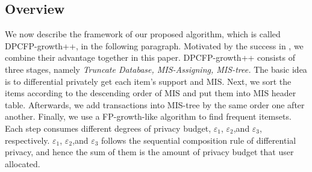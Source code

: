 \documentclass[conference]{IEEEtran}
\begin{document}
\subsection{Overview}
We now describe the framework of our proposed algorithm, which is called DPCFP-growth++, in the following paragraph. 
Motivated by the success in \cite{b4}\cite{b6}\cite{b8}, we combine their advantage together in this paper. 
DPCFP-growth++ consists of three stages, namely {\it{Truncate Database}, \it{MIS-Assigning}, \it{MIS-tree}.} 
The basic idea is to differential privately get each item's support and MIS. 
Next, we sort the items according to the descending order of MIS and put them into MIS header table. 
Afterwards, we add transactions into MIS-tree by the same order one after another. 
Finally, we use a FP-growth-like algorithm to find frequent itemsets.
Each step consumes different degrees of privacy budget, $\varepsilon_1$, $\varepsilon_2$,and $\varepsilon_3$, respectively.
$\varepsilon_1$, $\varepsilon_2$,and $\varepsilon_3$ follows the sequential composition rule of differential privacy, and hence the sum of them is the amount of privacy budget that user allocated.
\end{document}
